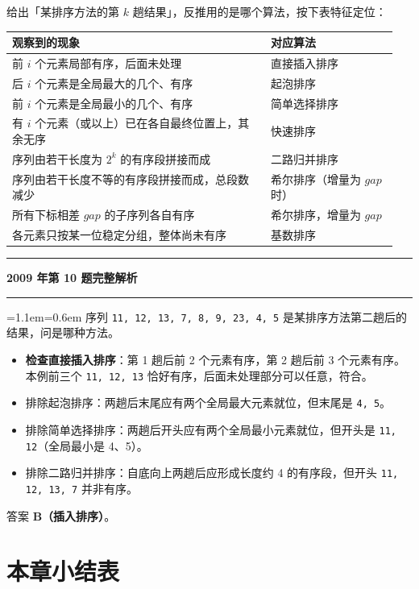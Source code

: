 \documentclass[11pt,openany,UTF8]{ctexbook}
\newcommand{\callouthead}[2]{%
  \par\addvspace{7pt}\noindent
  {\color{#1}\rule[-0.15em]{3pt}{1.05em}}\hspace{0.5em}%
  {\bfseries\color{#1}#2}\par\nobreak\vspace{-0.35em}%
  {\color{rulesep}\hrule height 0.4pt}\nobreak\vspace{0.45em}%
  \begingroup\small\setlength{\parindent}{0pt}%
  \leftskip=1.1em\rightskip=0.6em\noindent\ignorespaces}
\newcommand{\calloutend}{\par\endgroup\addvspace{7pt}}
\newenvironment{callexam}[1]{\callouthead{exambar}{#1}}{\calloutend}
\begin{document}
给出「某排序方法的第 $k$ 趟结果」，反推用的是哪个算法，按下表特征定位：

\begingroup\small\setlength{\tabcolsep}{4.0pt}
\begin{longtable}{@{}L{0.6344\linewidth}L{0.3113\linewidth}@{}}
\toprule
\textbf{观察到的现象} & \textbf{对应算法} \\
\midrule
\endhead
前 $i$ 个元素局部有序，后面未处理 & 直接插入排序 \\
后 $i$ 个元素是全局最大的几个、有序 & 起泡排序 \\
前 $i$ 个元素是全局最小的几个、有序 & 简单选择排序 \\
有 $i$ 个元素（或以上）已在各自最终位置上，其余无序 & 快速排序 \\
序列由若干长度为 $2^k$ 的有序段拼接而成 & 二路归并排序 \\
序列由若干长度不等的有序段拼接而成，总段数减少 & 希尔排序（增量为 $gap$ 时） \\
所有下标相差 $gap$ 的子序列各自有序 & 希尔排序，增量为 $gap$ \\
各元素只按某一位稳定分组，整体尚未有序 & 基数排序 \\
\bottomrule
\end{longtable}
\endgroup

\begin{callexam}{2009 年第 10 题完整解析}
序列 \texttt{11,\allowbreak{} 12,\allowbreak{} 13,\allowbreak{} 7,\allowbreak{} 8,\allowbreak{} 9,\allowbreak{} 23,\allowbreak{} 4,\allowbreak{} 5} 是某排序方法第二趟后的结果，问是哪种方法。

\begin{itemize}
\item \textbf{检查直接插入排序}：第 1 趟后前 2 个元素有序，第 2 趟后前 3 个元素有序。本例前三个 \texttt{11,\allowbreak{} 12,\allowbreak{} 13} 恰好有序，后面未处理部分可以任意，符合。
\item 排除起泡排序：两趟后末尾应有两个全局最大元素就位，但末尾是 \texttt{4,\allowbreak{} 5}。
\item 排除简单选择排序：两趟后开头应有两个全局最小元素就位，但开头是 \texttt{11,\allowbreak{} 12}（全局最小是 4、5）。
\item 排除二路归并排序：自底向上两趟后应形成长度约 4 的有序段，但开头 \texttt{11,\allowbreak{} 12,\allowbreak{} 13,\allowbreak{} 7} 并非有序。
\end{itemize}
答案 \textbf{B（插入排序）}。

\end{callexam}

\section*{本章小结表}
\end{document}
